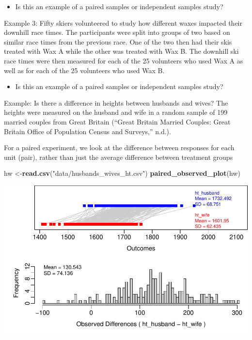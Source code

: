 \documentclass[
]{report}
\newenvironment{Shaded}{\begin{snugshade}}{\end{snugshade}}
\newcommand{\FunctionTok}[1]{\textcolor[rgb]{0.13,0.29,0.53}{\textbf{#1}}}
\newcommand{\NormalTok}[1]{#1}
\newcommand{\OtherTok}[1]{\textcolor[rgb]{0.56,0.35,0.01}{#1}}
\newcommand{\StringTok}[1]{\textcolor[rgb]{0.31,0.60,0.02}{#1}}
\providecommand{\tightlist}{%
  \setlength{\itemsep}{0pt}\setlength{\parskip}{0pt}}
\begin{document}
\begin{itemize}
\tightlist
\item
  Is this an example of a paired samples or independent samples study?
\end{itemize}

\vspace{0.3in}

Example 3: Fifty skiers volunteered to study how different waxes impacted their downhill race times. The participants were split into groups of two based on similar race times from the previous race. One of the two then had their skis treated with Wax A while the other was treated with Wax B. The downhill ski race times were then measured for each of the 25 volunteers who used Wax A as well as for each of the 25 volunteers who used Wax B.

\begin{itemize}
\tightlist
\item
  Is this an example of a paired samples or independent samples study?
\end{itemize}

\vspace{0.3in}

Example: Is there a difference in heights between husbands and wives? The heights were measured on the husband and wife in a random sample of 199 married couples from Great Britain ({``Great Britain Married Couples: Great Britain Office of Population Census and Surveys,''} n.d.).

For a paired experiment, we look at the difference between responses for each unit (pair), rather than just the average difference between treatment groups

\begin{Shaded}
\begin{Highlighting}[]
\NormalTok{hw }\OtherTok{\textless{}{-}}\FunctionTok{read.csv}\NormalTok{(}\StringTok{"data/husbands\_wives\_ht.csv"}\NormalTok{)}
\FunctionTok{paired\_observed\_plot}\NormalTok{(hw)}
\end{Highlighting}
\end{Shaded}

\begin{center}\includegraphics[width=0.7\linewidth]{11-VN11-paired_files/figure-latex/unnamed-chunk-1-1} \end{center}
\end{document}

